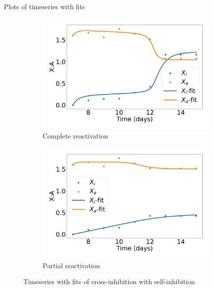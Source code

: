 \documentclass[aspectratio=169,9pt]{beamer}
\begin{document}
    \begin{frame}{Plots of timeseries with fits}
        \begin{figure}[h]
            \centering
            \begin{subfigure}[b]{0.49\textwidth}
                \centering
                \includegraphics[width=\textwidth]{IIII-iPSC_timeshifted-timeseries}
                \caption{Complete reactivation}
            \end{subfigure}
            \begin{subfigure}[b]{0.49\textwidth}
                \centering
                \includegraphics[width=\textwidth]{IIII-Partial_timeshifted-timeseries}
                \caption{Partial reactivation}
            \end{subfigure}
            \caption{Timeseries with fits of cross-inhibition with self-inhibition}
        \end{figure}
    \end{frame}
\end{document}
